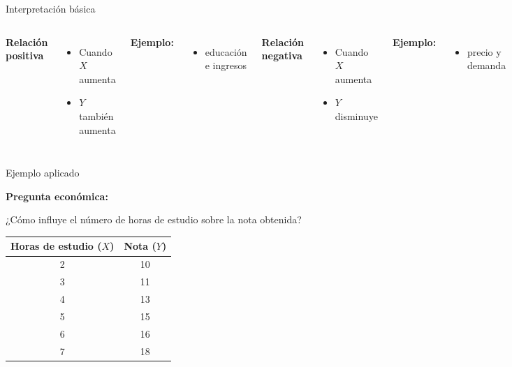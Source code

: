 \documentclass{beamer}
\begin{document}
\begin{frame}{Interpretación básica}

\begin{columns}


\textbf{Relación positiva}

\begin{itemize}
\item Cuando \(X\) aumenta
\item \(Y\) también aumenta
\end{itemize}

\vspace{0.4cm}

\textbf{Ejemplo:}
\begin{itemize}
\item educación e ingresos
\end{itemize}


\textbf{Relación negativa}

\begin{itemize}
\item Cuando \(X\) aumenta
\item \(Y\) disminuye
\end{itemize}

\vspace{0.4cm}

\textbf{Ejemplo:}
\begin{itemize}
\item precio y demanda
\end{itemize}

\end{columns}

\end{frame}

\begin{frame}{Ejemplo aplicado}

\textbf{Pregunta económica:}

\vspace{0.2cm}

¿Cómo influye el número de horas de estudio sobre la nota obtenida?

\vspace{0.4cm}

\begin{center}
\begin{tabular}{cc}
\toprule
Horas de estudio (\(X\)) & Nota (\(Y\)) \\
\midrule
2 & 10 \\
3 & 11 \\
4 & 13 \\
5 & 15 \\
6 & 16 \\
7 & 18 \\
\bottomrule
\end{tabular}
\end{center}

\end{frame}
\end{document}
